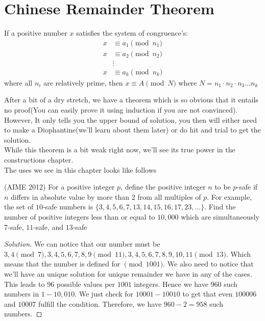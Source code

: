 \section{Chinese Remainder Theorem}
\begin{theorem}
    If a positive number $x$ satisfies the system of congruence's:
    \[
    \begin{aligned}
        x &\equiv a_1 \pmod{n_1} \\
        x &\equiv a_2 \pmod{n_2} \\
        &\vdots \\
        x &\equiv a_k \pmod{n_k}
    \end{aligned}
    \]
    where all $n_i$ are relatively prime, then $x \equiv A \pmod{N}$ where $N=n_1 \cdot n_2 \cdot n_3 \dots n_k$
\end{theorem}
After a bit of a dry stretch, we have a theorem which is so obvious that it entails no proof(You can easily prove it using induction if you are not convinced). However, It only tells you the upper bound of solution, you then will either need to make a Diophantine(we'll learn about them later) or do hit and trial to get the solution.\\
While this theorem is a bit weak right now, we'll see its true power in the constructions chapter.\\
The uses we see in this chapter looks like follows\\
\begin{example}
    (AIME 2012)
    For a positive integer $p$, define the positive integer $n$ to be $p$-safe if $n$ differs in absolute value by more than $2$ from all multiples of $p$. For example, the set of $10$-safe numbers is $\{ 3, 4, 5, 6, 7, 13, 14, 15, 16, 17, 23, \ldots\}$. Find the number of positive integers less than or equal to $10,000$ which are simultaneously $7$-safe, $11$-safe, and $13$-safe
\end{example}
\begin{proof}
    [Solution]
    We can notice that our number must be $3,4 \pmod{7}, 3,4,5,6,7,8,9 \pmod{11}, 3,4,5,6,7,8,9,10,11 \pmod{13}$. Which means that the number is defined for $\pmod{1001}$. We also need to notice that we'll have an unique solution for unique remainder we have in any of the cases.\\
    This leads to $96$ possible values per $1001$ integers. Hence we have $960$ such numbers in $1-10,010$. We just check for $10001- 10010$ to get that even $100006$ and $10007$ fulfill the condition. Therefore, we have $960-2=958$ such numbers.
\end{proof}

